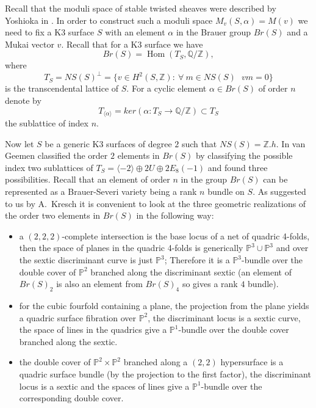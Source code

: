 \documentclass[a4paper,11pt]{amsart}
\theoremstyle{definition}
\numberwithin{equation}{section}
\numberwithin{equation}{section} \theoremstyle{definition}
\begin{document}
Recall that the moduli space of stable twisted sheaves were described by Yoshioka in \cite{Yo}.
In order to construct such a moduli space $M_v(S,\alpha)=M(v)$ we need to fix a K3 surface $S$ with an element $\alpha$ in the Brauer group $Br(S)$ and a Mukai vector $v$.
Recall that for a K3 surface we have 
$$Br(S)=\operatorname{Hom}(T_S,{{\mathbb{Q}}}/ {\mathbb{Z}}),$$
where 
$$T_S =NS(S)^{\perp} = \{ v\in H^2(S,{\mathbb{Z}})\colon \ \forall \  m\in NS(S) \ \ \ vm=0 \}$$ is the transcendental lattice of $S$.
For a cyclic element $\alpha \in Br(S)$ of order $n$ denote by
$$T_{\langle\alpha\rangle}= ker(\alpha \colon T_S \to {{\mathbb{Q}}} / {\mathbb{Z}})\subset T_S$$ the sublattice of index $n$.

Now let $S$ be a generic K3 surfaces of degree $2$ such that $NS(S)={\mathbb{Z}}.h$. 
 In \cite{vG} van Geemen classified the order $2$ elements in $Br(S)$ by classifying 
the possible index two sublattices of $T_S=\langle-2 \rangle \oplus 2 U\oplus 2 E_8(-1)$ and found three possibilities.
 Recall that an element of order $n$ in the group $Br(S)$ can be represented as a Brauer-Severi variety being a rank $n$ bundle on $S$. As suggested to us by A.~Kresch it is convenient to look at the three geometric realizations of the order two elements in $Br(S)$ in the following way:
\begin{itemize}
\item a $(2,2,2)$-complete intersection is the base locus of a net of quadric 4-folds,
then the space of planes in the quadric 4-folds is generically ${{\mathbb{P}}}^3 \cup {{\mathbb{P}}}^3$
and over the sextic discriminant curve is just ${{\mathbb{P}}}^3$; Therefore it is a ${{\mathbb{P}}}^3$-bundle
over the double cover of ${{\mathbb{P}}}^2$ branched along the discriminant sextic
(an element of $Br(S)_2$ is also an element from $Br(S)_4$ so gives a rank $4$ bundle).

\item for the cubic fourfold containing a plane, the projection from the plane yields a
quadric surface fibration over ${{\mathbb{P}}}^2$, the  discriminant locus is a sextic curve, the
space of lines in the quadrics give a ${{\mathbb{P}}}^1$-bundle over the double cover branched along the sextic.

\item the double cover of ${{\mathbb{P}}}^2 \times {{\mathbb{P}}}^2$ branched along a $(2,2)$ hypersurface is a quadric surface bundle (by the projection to the first factor), the discriminant locus is
a sextic and the spaces of lines give a ${{\mathbb{P}}}^1$-bundle over the corresponding double cover.
\end{itemize}
\end{document}
